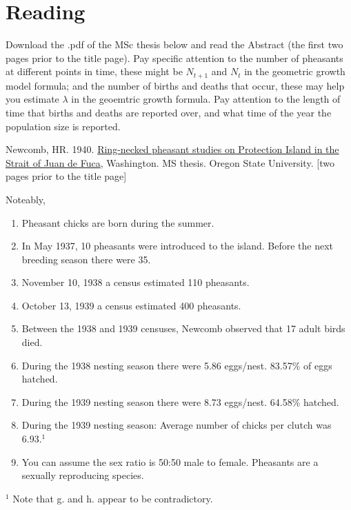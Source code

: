 \documentclass[
]{book}
\providecommand{\tightlist}{%
  \setlength{\itemsep}{0pt}\setlength{\parskip}{0pt}}
\begin{document}
\hypertarget{reading-1}{%
\section{Reading}\label{reading-1}}

Download the .pdf of the MSc thesis below and read the Abstract (the first two pages prior to the title page). Pay specific attention to the number of pheasants at different points in time, these might be \(N_{t+1}\) and \(N_t\) in the geometric growth model formula; and the number of births and deaths that occur, these may help you estimate \(\lambda\) in the geoemtric growth formula. Pay attention to the length of time that births and deaths are reported over, and what time of the year the population size is reported.

Newcomb, HR. 1940. \href{https://ir.library.oregonstate.edu/concern/graduate_thesis_or_dissertations/js956j801?locale=en}{Ring-necked pheasant studies on Protection Island in the Strait of Juan de Fuca}, Washington. MS thesis. Oregon State University. {[}two pages prior to the title page{]}

Noteably,

\begin{enumerate}
\def\labelenumi{\alph{enumi}.}
\tightlist
\item
  Pheasant chicks are born during the summer.
\item
  In May 1937, 10 pheasants were introduced to the island. Before the next breeding season there were 35.
\item
  November 10, 1938 a census estimated 110 pheasants.
\item
  October 13, 1939 a census estimated 400 pheasants.
\item
  Between the 1938 and 1939 censuses, Newcomb observed that 17 adult birds died.
\item
  During the 1938 nesting season there were 5.86 eggs/nest. 83.57\% of eggs hatched.
\item
  During the 1939 nesting season there were 8.73 eggs/nest. 64.58\% hatched.
\item
  During the 1939 nesting season: Average number of chicks per clutch was 6.93.\(^1\)
\item
  You can assume the sex ratio is 50:50 male to female. Pheasants are a sexually reproducing species.
\end{enumerate}

\(^1\) Note that g. and h. appear to be contradictory.
\end{document}
